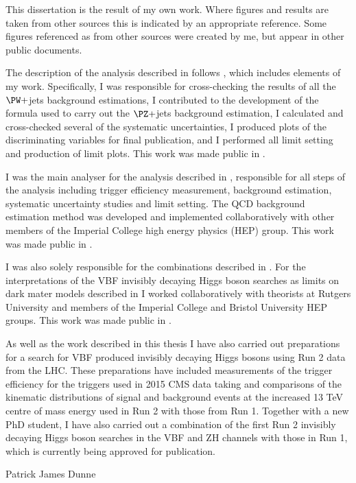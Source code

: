 \begin{declaration}
  This dissertation is the result of my own work. Where figures and results are taken from other sources this is indicated by an appropriate reference. Some figures referenced as from other sources were created by me, but appear in other public documents. 

The description of the analysis described in  follows , which includes elements of my work. Specifically, I was responsible for cross-checking the results of all the $\PW+$jets background estimations, I contributed to the development of the formula used to carry out the $\PZ+$jets background estimation, I calculated and cross-checked several of the systematic uncertainties, I produced plots of the discriminating variables for final publication, and I performed all limit setting and production of limit plots. This work was made public in .

I was the main analyser for the analysis described in , responsible for all steps of the analysis including trigger efficiency measurement, background estimation, systematic uncertainty studies and limit setting. The QCD background estimation method was developed and implemented collaboratively with other members of the Imperial College high energy physics (HEP) group. This work was made public in .

I was also solely responsible for the combinations described in . For the interpretations of the VBF invisibly decaying Higgs boson searches as limits on dark mater models described in  I worked collaboratively with theorists at Rutgers University and members of the Imperial College and Bristol University HEP groups. This work was made public in .

As well as the work described in this thesis I have also carried out preparations for a search for VBF produced invisibly decaying Higgs bosons using Run 2 data from the LHC. These preparations have included measurements of the trigger efficiency for the triggers used in 2015 CMS data taking and comparisons of the kinematic distributions of signal and background events at the increased 13 TeV centre of mass energy used in Run 2 with those from Run 1. Together with a new PhD student, I have also carried out a combination of the first Run 2 invisibly decaying Higgs boson searches in the VBF and ZH channels with those in Run 1, which is currently being approved for publication.


  \vspace*{1cm}
  \begin{flushright}
    Patrick James Dunne
  \end{flushright}
\end{declaration}


